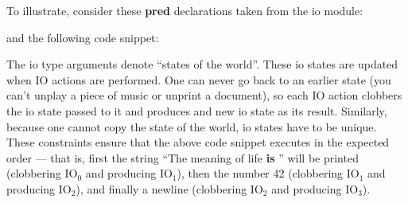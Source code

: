 \documentclass[a4paper,11pt,notitlepage,onecolumn]{book}
\begin{document}
To illustrate, consider these \textsf{\textbf{pred}} declarations taken from the \textsf{io}
module:

\begin{small}

\begin{ptabular}
\nextline
{}
\nextline
{}
\nextline
\end{ptabular}

\end{small}

and the following code snippet:

\begin{small}

\begin{ptabular}
\nextline
{}
\nextline
{}
\nextline
\end{ptabular}

\end{small}

The \textsf{io} type arguments denote ``states of the world''.  These \textsf{io} states
are updated when IO actions are performed.  One can never go back to an
earlier state (you can't unplay a piece of music or unprint a document),
so each IO action clobbers the \textsf{io} state passed to it and produces
and new \textsf{io} state as its result.  Similarly, because one cannot copy the
state of the world, \textsf{io} states have to be unique.  These constraints ensure
that the above code snippet executes in the expected order --- that is,
first the string \textsf{``The meaning of life \textbf{is} ''} will be printed
(clobbering \textsf{IO$_{0}$} and producing \textsf{IO$_{1}$}), then the number \textsf{42}
(clobbering \textsf{IO$_{1}$} and producing \textsf{IO$_{2}$}), and finally a newline (clobbering
\textsf{IO$_{2}$} and producing \textsf{IO$_{3}$}).
\end{document}
